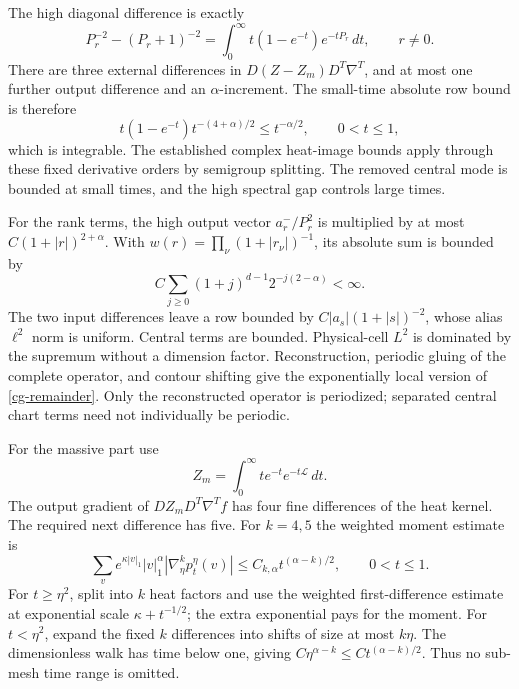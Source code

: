 \documentclass[11pt]{article}
\theoremstyle{remark}
\begin{document}
The high diagonal difference is exactly
\begin{equation}\label{cg-high-remainder}
 P_r^{-2}-(P_r+1)^{-2}
 =\int_0^\infty t(1-e^{-t})e^{-tP_r}\,dt,
 \qquad r\ne0.
\end{equation}
There are three external differences in
$D(Z-Z_m)D^T\nabla^T$, and at most one further output
difference and an $\alpha$-increment. The small-time absolute
row bound is therefore
\begin{equation}\label{cg-time-budget}
 t(1-e^{-t})t^{-(4+\alpha)/2}\le t^{-\alpha/2},
 \qquad 0<t\le1,
\end{equation}
which is integrable. The established complex heat-image bounds
apply through these fixed derivative orders by semigroup
splitting. The removed central mode is bounded at small times,
and the high spectral gap controls large times.

For the rank terms, the high output vector $a_r^-/P_r^2$ is
multiplied by at most $C(1+|r|)^{2+\alpha}$.
With $w(r)=\prod_\nu(1+|r_\nu|)^{-1}$, its absolute sum is
bounded by
\[
 C\sum_{j\ge0}(1+j)^{d-1}2^{-j(2-\alpha)}<\infty.
\]
The two input differences leave a row bounded by
$C|a_s|(1+|s|)^{-2}$, whose alias $\ell^2$ norm is uniform.
Central terms are bounded. Physical-cell $L^2$ is dominated by
the supremum without a dimension factor. Reconstruction, periodic
gluing of the complete operator, and contour shifting give the
exponentially local version of \eqref{cg-remainder}.
Only the reconstructed operator is periodized; separated central
chart terms need not individually be periodic.

For the massive part use
\begin{equation}\label{cg-massive-heat}
 Z_m=\int_0^\infty t e^{-t}e^{-t\mathcal L}\,dt.
\end{equation}
The output gradient of $DZ_mD^T\nabla^Tf$ has four fine
differences of the heat kernel. The required next difference
has five. For $k=4,5$ the weighted moment estimate is
\begin{equation}\label{cg-moments}
 \sum_v e^{\kappa|v|_1}|v|_1^\alpha
       |\nabla_\eta^k p_t^\eta(v)|
       \le C_{k,\alpha}t^{(\alpha-k)/2},
       \qquad 0<t\le1.
\end{equation}
For $t\ge\eta^2$, split into $k$ heat factors and use the
weighted first-difference estimate at exponential scale
$\kappa+t^{-1/2}$; the extra exponential pays for the moment.
For $t<\eta^2$, expand the fixed $k$ differences into shifts of
size at most $k\eta$. The dimensionless walk has time below one,
giving $C\eta^{\alpha-k}\le Ct^{(\alpha-k)/2}$.
Thus no sub-mesh time range is omitted.
\end{document}

